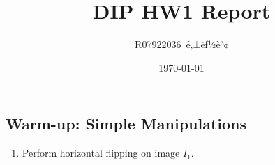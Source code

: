 \documentclass[12pt,a4paper,notitlepage,oneside,amsmath,amssymb]{article}
\begin{document}
\begin{CJK*}{UTF8}{bkai}

  \CJKtilde{}
  \CJKindent{}
  \title{\vspace{-10ex}DIP HW1 Report}
  \author{R07922036~é‚±èƒ½è³¢}
  \date{\vspace{-1ex}\today}

  \maketitle

  \vspace{-5ex}

  \section*{Warm-up: Simple Manipulations}
  \begin{enumerate}[label=(\alph*)]
    \item Perform horizontal flipping on image \(I_1\).


\end{enumerate}
\end{CJK*}
\end{document}
